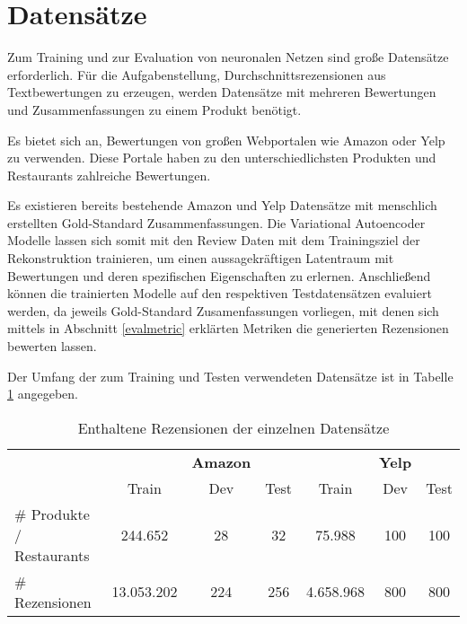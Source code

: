 \section{Datensätze}\raggedbottom
\label{dataset}
Zum Training und zur Evaluation von neuronalen Netzen sind große Datensätze erforderlich. 
Für die Aufgabenstellung, Durchschnittsrezensionen aus Textbewertungen zu erzeugen, werden Datensätze mit mehreren Bewertungen und Zusammenfassungen zu einem Produkt benötigt.

Es bietet sich an, Bewertungen von großen Webportalen wie Amazon oder Yelp zu verwenden. 
Diese Portale haben zu den unterschiedlichsten Produkten und Restaurants zahlreiche Bewertungen.

Es existieren bereits bestehende Amazon und Yelp Datensätze mit menschlich erstellten Gold-Standard Zusammenfassungen. 
Die Variational Autoencoder Modelle lassen sich somit mit den Review Daten mit dem Trainingsziel der Rekonstruktion trainieren, um einen aussagekräftigen Latentraum mit Bewertungen und deren spezifischen Eigenschaften zu erlernen.
Anschließend können die trainierten Modelle auf den respektiven Testdatensätzen evaluiert werden, da jeweils Gold-Standard Zusamenfassungen vorliegen, mit denen sich mittels in Abschnitt \ref{evalmetric} erklärten Metriken die generierten Rezensionen bewerten lassen.

Der Umfang der zum Training und Testen verwendeten Datensätze ist in Tabelle \ref{dataset_table} angegeben.

\begin{table}[!h]
    \centering
    \begin{tabular}{@{}lcccccc@{}}
        \toprule
                              &            & \textbf{Amazon} &      &           & \textbf{Yelp} &      \\
                              & Train      & Dev             & Test & Train     & Dev           & Test \\ \midrule
    \# Produkte / Restaurants & 244.652    &   28            &  32  & 75.988    &  100          &  100    \\
    \# Rezensionen            & 13.053.202 &    224          &   256& 4.658.968 &  800          &  800 \\ \bottomrule
    \end{tabular}
    \caption{Enthaltene Rezensionen der einzelnen Datensätze \citep{coop}}
    \label{dataset_table}
    \end{table}

